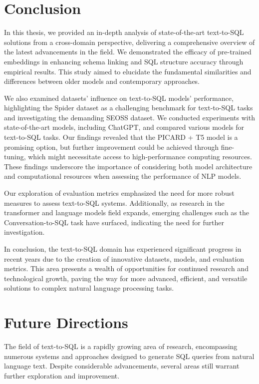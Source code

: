 \section{Conclusion}
In this thesis, we provided an in-depth analysis of state-of-the-art text-to-SQL solutions from a cross-domain perspective, delivering a comprehensive overview of the latest advancements in the field. We demonstrated the efficacy of pre-trained embeddings in enhancing schema linking and SQL structure accuracy through empirical results. This study aimed to elucidate the fundamental similarities and differences between older models and contemporary approaches.

We also examined datasets' influence on text-to-SQL models' performance, highlighting the Spider dataset as a challenging benchmark for text-to-SQL tasks and investigating the demanding SEOSS dataset. We conducted experiments with state-of-the-art models, including ChatGPT, and compared various models for text-to-SQL tasks. Our findings revealed that the PICARD + T5 model is a promising option, but further improvement could be achieved through fine-tuning, which might necessitate access to high-performance computing resources. These findings underscore the importance of considering both model architecture and computational resources when assessing the performance of NLP models.

Our exploration of evaluation metrics emphasized the need for more robust measures to assess text-to-SQL systems. Additionally, as research in the transformer and language models field expands, emerging challenges such as the Conversation-to-SQL task have surfaced, indicating the need for further investigation.

In conclusion, the text-to-SQL domain has experienced significant progress in recent years due to the creation of innovative datasets, models, and evaluation metrics. This area presents a wealth of opportunities for continued research and technological growth, paving the way for more advanced, efficient, and versatile solutions to complex natural language processing tasks.

\clearpage
\thispagestyle{plain}
\section{Future Directions}

The field of text-to-SQL is a rapidly growing area of research, encompassing numerous systems and approaches designed to generate SQL queries from natural language text. Despite considerable advancements, several areas still warrant further exploration and improvement.


